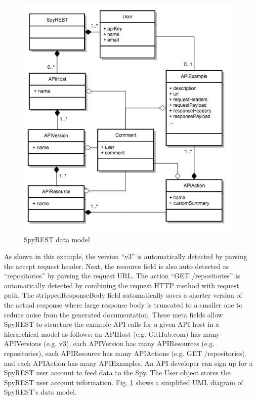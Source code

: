 \documentclass[conference]{IEEEtran}
\begin{document}
\begin{figure}[!tbh]
  \centering
  \includegraphics[width=\linewidth]{data_model.png}
  \caption{SpyREST data model}
  \label{fig:data_model}
\end{figure}


As shown in this example, the version ``v3'' is automatically detected by parsing the accept request header. Next, the resource field is also auto detected as ``repositories'' by parsing the request URL. The action ``GET /repositories'' is automatically detected by combining the request HTTP method with request path. The strippedResponseBody field automatically saves a shorter version of the actual response where large response body is truncated to a smaller one to reduce noise from the generated documentation. These meta fields allow SpyREST to structure the example API calls for a given API host in a hierarchical model as follows: an APIHost (e.g. GitHub.com) has many APIVersions (e.g. v3), each APIVersion has many APIResources (e.g. repositories), each APIResource has many APIActions (e.g. GET /repositories), and each APIAction has many APIExamples. An API developer can sign up for a SpyREST user account to feed data to the Spy. The User object stores the SpyREST user account information. Fig. \ref{fig:data_model} shows a simplified UML diagram of SpyREST's data model.
\end{document}
